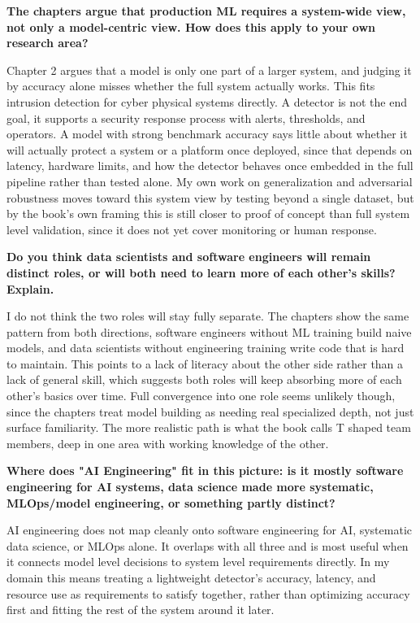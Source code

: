 \documentclass[11pt,a4paper]{article}
\begin{document}
\textbf{The chapters argue that production ML requires a system-wide view, not only a model-centric view. How does this apply to your own research area?}

Chapter 2 argues that a model is only one part of a larger system, and judging it by accuracy alone misses whether the full system actually works. This fits intrusion detection for cyber physical systems directly. A detector is not the end goal, it supports a security response process with alerts, thresholds, and operators. A model with strong benchmark accuracy says little about whether it will actually protect a system or a platform once deployed, since that depends on latency, hardware limits, and how the detector behaves once embedded in the full pipeline rather than tested alone. My own work on generalization and adversarial robustness moves toward this system view by testing beyond a single dataset, but by the book's own framing this is still closer to proof of concept than full system level validation, since it does not yet cover monitoring or human response.

\textbf{Do you think data scientists and software engineers will remain distinct roles, or will both need to learn more of each other's skills? Explain.}

I do not think the two roles will stay fully separate. The chapters show the same pattern from both directions, software engineers without ML training build naive models, and data scientists without engineering training write code that is hard to maintain. This points to a lack of literacy about the other side rather than a lack of general skill, which suggests both roles will keep absorbing more of each other's basics over time. Full convergence into one role seems unlikely though, since the chapters treat model building as needing real specialized depth, not just surface familiarity. The more realistic path is what the book calls T shaped team members, deep in one area with working knowledge of the other.

\textbf{Where does "AI Engineering" fit in this picture: is it mostly software engineering for AI systems, data science made more systematic, MLOps/model engineering, or something partly distinct?}

AI engineering does not map cleanly onto software engineering for AI, systematic data science, or MLOps alone. It overlaps with all three and is most useful when it connects model level decisions to system level requirements directly. In my domain this means treating a lightweight detector's accuracy, latency, and resource use as requirements to satisfy together, rather than optimizing accuracy first and fitting the rest of the system around it later.
\end{document}
